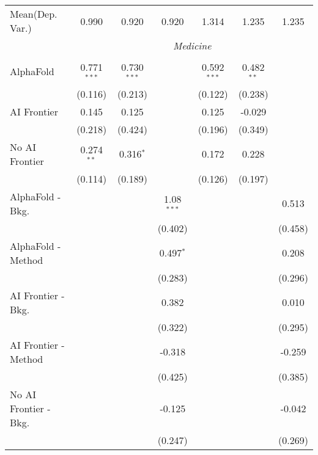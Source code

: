 \begin{tabular}{lcccccc}
Mean(Dep. Var.) & 0.990 & 0.920 & 0.920 & 1.314 & 1.235 & 1.235 \\
 & \multicolumn{6}{c}{\textit{Medicine}} \\ \\
   AlphaFold               & 0.771$^{***}$ & 0.730$^{***}$ &              & 0.592$^{***}$ & 0.482$^{**}$ &   \\   
                           & (0.116)       & (0.213)       &              & (0.122)       & (0.238)      &   \\   
   AI Frontier             & 0.145         & 0.125         &              & 0.125         & -0.029       &   \\   
                           & (0.218)       & (0.424)       &              & (0.196)       & (0.349)      &   \\   
   No AI Frontier          & 0.274$^{**}$  & 0.316$^{*}$   &              & 0.172         & 0.228        &   \\   
                           & (0.114)       & (0.189)       &              & (0.126)       & (0.197)      &   \\   
   AlphaFold - Bkg.        &               &               & 1.08$^{***}$ &               &              & 0.513\\   
                           &               &               & (0.402)      &               &              & (0.458)\\   
   AlphaFold - Method      &               &               & 0.497$^{*}$  &               &              & 0.208\\   
                           &               &               & (0.283)      &               &              & (0.296)\\   
   AI Frontier - Bkg.      &               &               & 0.382        &               &              & 0.010\\   
                           &               &               & (0.322)      &               &              & (0.295)\\   
   AI Frontier - Method    &               &               & -0.318       &               &              & -0.259\\   
                           &               &               & (0.425)      &               &              & (0.385)\\   
   No AI Frontier - Bkg.   &               &               & -0.125       &               &              & -0.042\\   
                           &               &               & (0.247)      &               &              & (0.269)\\   

\end{tabular}
